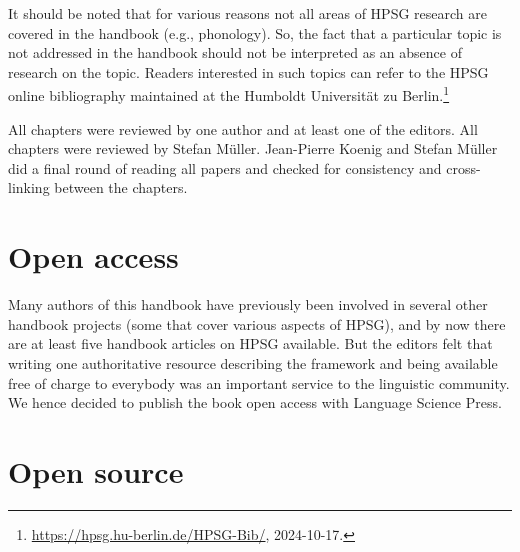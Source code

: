 \begin{refsection}
It should be noted that for various reasons not all areas of HPSG research are covered in the
handbook (e.g., phonology). So, the fact that a particular topic is not addressed in the handbook
should not be interpreted as an absence of research on the topic. Readers interested in such topics
can refer to the HPSG online bibliography maintained at the Humboldt Universität zu Berlin.\footnote{%
\url{https://hpsg.hu-berlin.de/HPSG-Bib/}, 2024-10-17.
}

All chapters were reviewed by one author and at least one of the editors. All chapters were reviewed
by Stefan Müller. Jean-Pierre Koenig and Stefan Müller did a final round of reading all papers and
checked for consistency and cross-linking between the chapters.


\section*{Open access}


Many authors of this handbook have previously been involved in several other handbook projects (some that cover various aspects of HPSG), and by now there are at least five handbook articles on HPSG available. But the editors felt that writing one authoritative resource describing the framework and being available free of charge to everybody was an important service to the linguistic community. We hence decided to publish the book open access with Language Science Press.


\section*{Open source}


\end{refsection}
